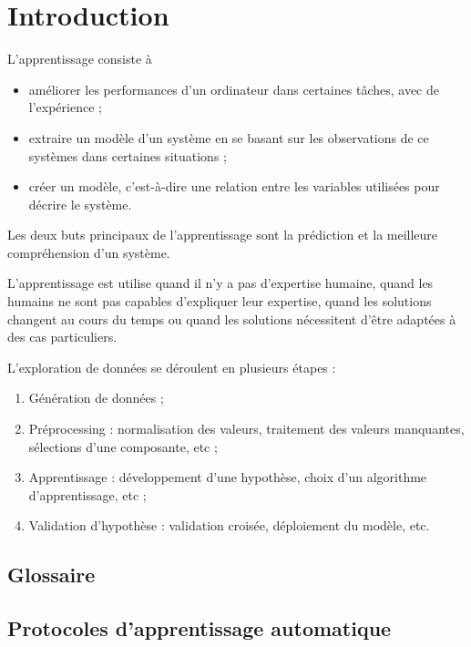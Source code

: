 \chapter{Introduction}

L'apprentissage consiste à

\begin{itemize}
	\item améliorer les performances d'un ordinateur dans certaines tâches, avec de l'expérience ;
	\item extraire un modèle d'un système en se basant sur les observations de ce systèmes dans certaines situations ;
	\item créer un modèle, c'est-à-dire une relation entre les variables utilisées pour décrire le système.
\end{itemize}

Les deux buts principaux de l'apprentissage sont la prédiction et la meilleure compréhension d'un système.

L'apprentissage est utilise quand il n'y a pas d'expertise humaine, quand les humains ne sont pas capables d'expliquer leur expertise, quand les solutions changent au cours du temps ou quand les solutions nécessitent d'être adaptées à des cas particuliers.


L'exploration de données se déroulent en plusieurs étapes :

\begin{enumerate}
	\item Génération de données ;
	\item Préprocessing : normalisation des valeurs, traitement des valeurs manquantes, sélections d'une composante, etc ;
	\item Apprentissage : développement d'une hypothèse, choix d'un algorithme d'apprentissage, etc ;
	\item Validation d'hypothèse : validation croisée, déploiement du modèle, etc.
\end{enumerate}

	\section{Glossaire}
	

	\section{Protocoles d'apprentissage automatique}
	
